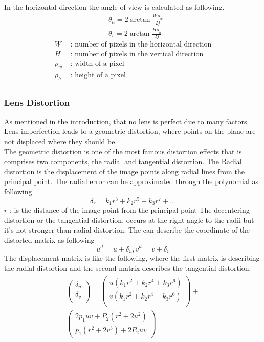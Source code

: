 \documentclass[journal,final,a4paper,twoside]{PS}
\begin{document}
In the horizontal direction the angle of view is calculated as following.
\begin{align}
&\theta_h = 2\arctan{\frac{{W\rho}_w}{2f}}\\& \theta_v = 2\arctan{\frac{{H\rho}_h}{2f}}
\end{align}
\begin{align*}
W&\text{ : number of pixels in the horizontal direction}\\
H&\text{ : number of pixels in the vertical direction}\\
\rho_w&\text{ : width of a pixel}\\
\rho_h&\text{ : height of a pixel}\\
\end{align*}


\subsubsection{Lens Distortion}
As mentioned in the introduction, that no lens is perfect due to many factors. Lens imperfection leads to a geometric distortion, where points on the plane are not displaced where they should be.
\\
The geometric distortion is one of the most famous distortion effects that is comprises two components, the radial and tangential distortion. The Radial distortion is the displacement of the image points along radial lines from the principal point. The radial error can be approximated through the polynomial as following 
\begin{equation}
\delta_r=k_1r^3+k_2r^5+k_3r^7+...
\end{equation}
$r$ : is the distance of the image point from the principal point
The decentering distortion or the tangential distortion, occurs at the right angle to the radii but it's not stronger than radial distortion.
The can describe the coordinate of the distorted matrix as following 
\begin{equation}
u^d = u+\delta_u,v^d=v+\delta_v
\end{equation}
The displacement matrix is like the following, where the first matrix is describing the radial distortion and the second matrix describes the tangential distortion\cite{Corke}.
\begin{align}
\begin{split}
\begin{pmatrix}
\delta_u\\
\delta_v\\
\end{pmatrix}=\begin{pmatrix}
u(k_1r^2+k_2r^4+k_3r^6)\\
v(k_1r^2+k_2r^4+k_3r^6)\\
\end{pmatrix}+\\
\begin{pmatrix}
2p_1uv+P_2(r^2+2u^2)\\
p_1(r^2+2v^3)+2P_2uv
\end{pmatrix}
\end{split}
\end{align}
\end{document}
